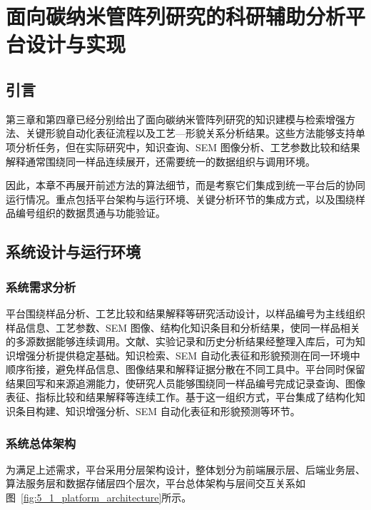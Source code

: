 \chapter{面向碳纳米管阵列研究的科研辅助分析平台设计与实现}
\label{chap:platform_design}

\section{引言}

第三章和第四章已经分别给出了面向碳纳米管阵列研究的知识建模与检索增强方法、关键形貌自动化表征流程以及工艺—形貌关系分析结果。这些方法能够支持单项分析任务，但在实际研究中，知识查询、SEM 图像分析、工艺参数比较和结果解释通常围绕同一样品连续展开，还需要统一的数据组织与调用环境。

因此，本章不再展开前述方法的算法细节，而是考察它们集成到统一平台后的协同运行情况。重点包括平台架构与运行环境、关键分析环节的集成方式，以及围绕样品编号组织的数据贯通与功能验证。

\section{系统设计与运行环境}

\subsection{系统需求分析}

平台围绕样品分析、工艺比较和结果解释等研究活动设计，以样品编号为主线组织样品信息、工艺参数、SEM 图像、结构化知识条目和分析结果，使同一样品相关的多源数据能够连续调用。文献、实验记录和历史分析结果经整理入库后，可为知识增强分析提供稳定基础。知识检索、SEM 自动化表征和形貌预测在同一环境中顺序衔接，避免样品信息、图像结果和解释证据分散在不同工具中。平台同时保留结果回写和来源追溯能力，使研究人员能够围绕同一样品编号完成记录查询、图像表征、指标比较和结果解释等连续工作。基于这一组织方式，平台集成了结构化知识条目构建、知识增强分析、SEM 自动化表征和形貌预测等环节。

\subsection{系统总体架构}

为满足上述需求，平台采用分层架构设计，整体划分为前端展示层、后端业务层、算法服务层和数据存储层四个层次，平台总体架构与层间交互关系如图~\ref{fig:5_1_platform_architecture}所示。

